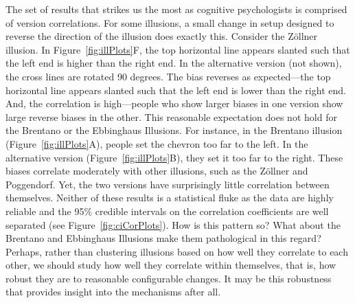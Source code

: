 The set of results that strikes us the most as cognitive psychologists is comprised of version correlations.  For some illusions, a small change in setup designed to reverse the direction of the illusion does exactly this.  Consider the Zöllner illusion.  In Figure~\ref{fig:illPlots}F, the top horizontal line appears slanted such that the left end is higher than the right end.  In the alternative version (not shown), the cross lines are rotated 90 degrees.  The bias reverses as expected---the top horizontal line appears slanted such that the left end is lower than the right end.  And, the correlation is high---people who show larger biases in one version show large reverse biases in the other.  This reasonable expectation does not hold for the Brentano or the Ebbinghaus Illusions.  For instance, in the Brentano illusion (Figure~\ref{fig:illPlots}A), people set the chevron too far to the left.  In the alternative version (Figure~\ref{fig:illPlots}B), they set it too far to the right.  These biases correlate moderately with other illusions, such as the Zöllner and Poggendorf.  Yet, the two versions have surprisingly little correlation between themselves.  Neither of these results is a statistical fluke as the data are highly reliable and the 95\% credible intervals on the correlation coefficients are well separated (see Figure~\ref{fig:ciCorPlots}).  How is this pattern so?  What about the Brentano and Ebbinghaus Illusions make them pathological in this regard?  Perhaps, rather than clustering illusions based on how well they correlate to each other, we should study how well they correlate within themselves, that is, how robust they are to reasonable configurable changes.  It may be this robustness that provides insight into the mechanisms after all.